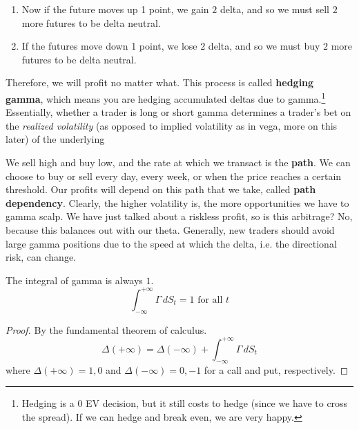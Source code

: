 \documentclass{article}
\begin{document}
    \begin{enumerate}
      \item Now if the future moves up 1 point, we gain $2$ delta, and so we must sell $2$ more futures to be delta neutral.
      \item If the futures move down 1 point, we lose $2$ delta, and so we must buy $2$ more futures to be delta neutral.
    \end{enumerate}
    Therefore, we will profit no matter what. This process is called \textbf{hedging gamma}, which means you are hedging accumulated deltas due to gamma.\footnote{Hedging is a $0$ EV decision, but it still costs to hedge (since we have to cross the spread). If we can hedge and break even, we are very happy.} Essentially, whether a trader is long or short gamma determines a trader's bet on the \textit{realized volatility} (as opposed to implied volatility as in vega, more on this later) of the underlying

    We sell high and buy low, and the rate at which we transact is the \textbf{path}. We can choose to buy or sell every day, every week, or when the price reaches a certain threshold. Our profits will depend on this path that we take, called \textbf{path dependency}. Clearly, the higher volatility is, the more opportunities we have to gamma scalp. We have just talked about a riskless profit, so is this arbitrage? No, because this balances out with our theta. Generally, new traders should avoid large gamma positions due to the speed at which the delta, i.e. the directional risk, can change. 

    \begin{lemma}
      The integral of gamma is always $1$.
      \begin{equation}
        \int_{-\infty}^{+\infty} \Gamma \,dS_t = 1 \text{ for all } t
      \end{equation}
    \end{lemma}
    \begin{proof}
      By the fundamental theorem of calculus.
      \begin{equation}
        \Delta (+\infty) = \Delta(-\infty) + \int_{-\infty}^{+\infty} \Gamma \,dS_t
      \end{equation}
      where $\Delta(+\infty) = 1, 0$ and $\Delta(-\infty) = 0, -1$ for a call and put, respectively.
    \end{proof}
\end{document}
